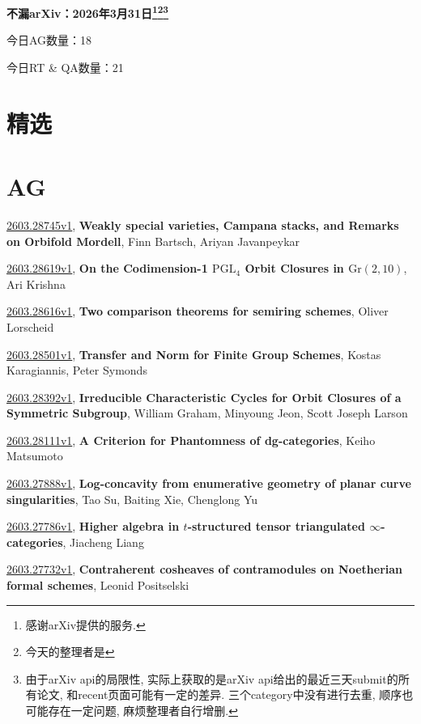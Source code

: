 \documentclass[9pt, a4paper]{article}
\theoremstyle{plain}
\theoremstyle{definition}
\theoremstyle{remark}
\newcommand{\arxiv}[3]{\href{https://arxiv.org/abs/#1}{#1}, \textbf{\textcolor{arxivblue}{#2}}, #3}
\newcommand{\AGnumber}{18}
\newcommand{\RTQAnumber}{21}
\newcommand{\NewestDate}{2026年3月31日}
\newcommand{\todayarXiver}{} %
\begin{document}
\begin{center}
    \Huge\textbf{不漏arXiv：\NewestDate\footnote{感谢arXiv提供的服务.}\footnote{今天的整理者是\todayarXiver}\footnote{由于arXiv api的局限性, 实际上获取的是arXiv api给出的最近三天submit的所有论文, 和recent页面可能有一定的差异. 三个category中没有进行去重, 顺序也可能存在一定问题, 麻烦整理者自行增删.}} \\
\end{center}

\setcounter{section}{-1}

\begin{center}
    今日AG数量：\AGnumber
    
    今日RT \& QA数量：\RTQAnumber
    
\end{center}


\section{精选}


\section{AG}
\arxiv{2603.28745v1}{Weakly special varieties, Campana stacks, and Remarks on Orbifold Mordell}{Finn Bartsch, Ariyan Javanpeykar}

\arxiv{2603.28619v1}{On the Codimension-1 $\mathrm{PGL}_4$ Orbit Closures in $\mathrm{Gr}(2,10)$}{Ari Krishna}

\arxiv{2603.28616v1}{Two comparison theorems for semiring schemes}{Oliver Lorscheid}

\arxiv{2603.28501v1}{Transfer and Norm for Finite Group Schemes}{Kostas Karagiannis, Peter Symonds}

\arxiv{2603.28392v1}{Irreducible Characteristic Cycles for Orbit Closures of a Symmetric Subgroup}{William Graham, Minyoung Jeon, Scott Joseph Larson}

\arxiv{2603.28111v1}{A Criterion for Phantomness of dg-categories}{Keiho Matsumoto}

\arxiv{2603.27888v1}{Log-concavity from enumerative geometry of planar curve singularities}{Tao Su, Baiting Xie, Chenglong Yu}

\arxiv{2603.27786v1}{Higher algebra in $t$-structured tensor triangulated $\infty$-categories}{Jiacheng Liang}

\arxiv{2603.27732v1}{Contraherent cosheaves of contramodules on Noetherian formal schemes}{Leonid Positselski}
\end{document}
